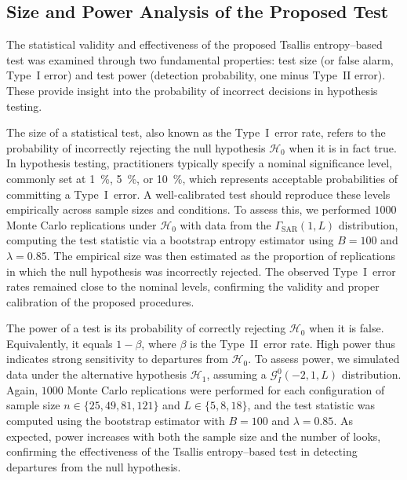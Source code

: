 \documentclass[
  lettersize  journal,
]{IEEEtran}%
\begin{document}
\subsection{Size and Power Analysis of the Proposed
Test}\label{size-and-power-analysis-of-the-proposed-test}

The statistical validity and effectiveness of the proposed Tsallis
entropy--based test was examined through two fundamental properties:
test size (or false alarm, Type~I error) and test power (detection
probability, one minus Type~II error). These provide insight into the
probability of incorrect decisions in hypothesis testing.

The size of a statistical test, also known as the Type~I~error rate,
refers to the probability of incorrectly rejecting the null hypothesis
\(\mathcal{H}_0\) when it is in fact true. In hypothesis testing,
practitioners typically specify a nominal significance level, commonly
set at \SI{1}{\percent}, \SI{5}{\percent}, or \SI{10}{\percent}, which
represents acceptable probabilities of committing a Type~I~error. A
well-calibrated test should reproduce these levels empirically across
sample sizes and conditions. To assess this, we performed \(1000\) Monte
Carlo replications under \(\mathcal{H}_0\) with data from the
\(\Gamma_{\mathrm{SAR}}(1,L)\) distribution, computing the test
statistic via a bootstrap entropy estimator using \(B=100\) and
\(\lambda=0.85\). The empirical size was then estimated as the
proportion of replications in which the null hypothesis was incorrectly
rejected. The observed Type~I~error rates remained close to the nominal
levels, confirming the validity and proper calibration of the proposed
procedures.

The power of a test is its probability of correctly rejecting
\(\mathcal{H}_0\) when it is false. Equivalently, it equals \(1-\beta\),
where \(\beta\) is the Type~II~error rate. High power thus indicates
strong sensitivity to departures from \(\mathcal{H}_0\). To assess
power, we simulated data under the alternative hypothesis
\(\mathcal{H}_1\), assuming a \(\mathcal{G}^0_I(-2,1,L)\) distribution.
Again, \(1000\) Monte Carlo replications were performed for each
configuration of sample size \(n \in \{25, 49, 81, 121\}\) and
\(L \in \{5, 8, 18\}\), and the test statistic was computed using the
bootstrap estimator with \(B=100\) and \(\lambda=0.85\). As expected,
power increases with both the sample size and the number of looks,
confirming the effectiveness of the Tsallis entropy--based test in
detecting departures from the null hypothesis.
\end{document}
